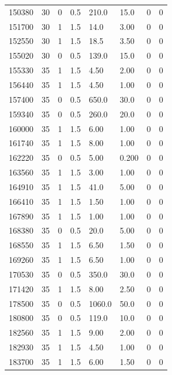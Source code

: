 \documentclass[preview]{standalone}
\begin{document}
{{{{{{{\begin{tabular}{L{1.2cm}C{1.2cm} C{0.3cm}C{0.5cm} C{1.4cm}C{1.4cm} C{1.4cm}C{1.4cm}}
  150380  &    30  & 0     & 0.5 &  210.0  & 15.0  & 0 &  0   \\ 
  151700  &    30  & 1     & 1.5 &  14.0  & 3.00  & 0 &  0   \\ 
  152550  &    30  & 1     & 1.5 &  18.5  & 3.50  & 0 &  0   \\ 
  155020  &    30  & 0     & 0.5 &  139.0  & 15.0  & 0 &  0   \\ 
  155330  &    35  & 1     & 1.5 &  4.50  & 2.00  & 0 &  0   \\ 
  156440  &    35  & 1     & 1.5 &  4.50  & 1.00  & 0 &  0   \\ 
  157400  &    35  & 0     & 0.5 &  650.0  & 30.0  & 0 &  0   \\ 
  159340  &    35  & 0     & 0.5 &  260.0  & 20.0  & 0 &  0   \\ 
  160000  &    35  & 1     & 1.5 &  6.00  & 1.00  & 0 &  0   \\ 
  161740  &    35  & 1     & 1.5 &  8.00  & 1.00  & 0 &  0   \\ 
  162220  &    35  & 0     & 0.5 &  5.00  & 0.200  & 0 &  0   \\ 
  163560  &    35  & 1     & 1.5 &  3.00  & 1.00  & 0 &  0   \\ 
  164910  &    35  & 1     & 1.5 &  41.0  & 5.00  & 0 &  0   \\ 
  166410  &    35  & 1     & 1.5 &  1.50  & 1.00  & 0 &  0   \\ 
  167890  &    35  & 1     & 1.5 &  1.00  & 1.00  & 0 &  0   \\ 
  168380  &    35  & 0     & 0.5 &  20.0  & 5.00  & 0 &  0   \\ 
  168550  &    35  & 1     & 1.5 &  6.50  & 1.50  & 0 &  0   \\ 
  169260  &    35  & 1     & 1.5 &  6.50  & 1.00  & 0 &  0   \\ 
  170530  &    35  & 0     & 0.5 &  350.0  & 30.0  & 0 &  0   \\ 
  171420  &    35  & 1     & 1.5 &  8.00  & 2.50  & 0 &  0   \\ 
  178500  &    35  & 0     & 0.5 &  1060.0  & 50.0  & 0 &  0   \\ 
  180800  &    35  & 0     & 0.5 &  119.0  & 10.0  & 0 &  0   \\ 
  182560  &    35  & 1     & 1.5 &  9.00  & 2.00  & 0 &  0   \\ 
  182930  &    35  & 1     & 1.5 &  4.50  & 1.00  & 0 &  0   \\ 
  183700  &    35  & 1     & 1.5 &  6.00  & 1.50  & 0 &  0   \\ 
\hline 
\end{tabular} 

}}}}}}}
\end{document}
